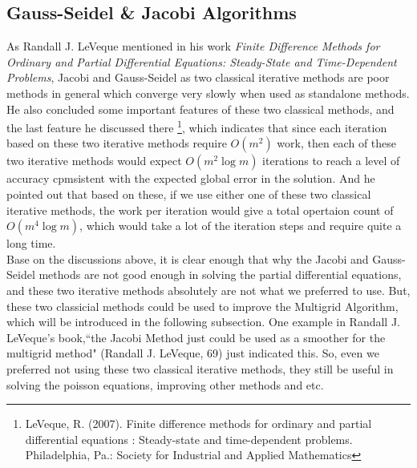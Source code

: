 \documentclass [a4paper, 12pt]{article}
\begin{document}
\subsection {Gauss-Seidel \& Jacobi Algorithms}
As Randall J. LeVeque mentioned in his work \emph {Finite Difference Methods for Ordinary and Partial Differential Equations: Steady-State and Time-Dependent Problems}, Jacobi and Gauss-Seidel as two classical iterative methods are poor methods in general which converge very slowly when used as standalone methods. He also concluded some important features of these two classical methods, and the last feature he discussed there \footnote {LeVeque, R. (2007). Finite difference methods for ordinary and partial differential equations : Steady-state and time-dependent problems. Philadelphia, Pa.: Society for Industrial and Applied Mathematics}, which indicates that since each iteration based on these two iterative methods require $O(m^2)$ work, then each of these two iterative methods would expect $O(m^2\log m)$ iterations to reach a level of accuracy cpmsistent with the expected global error in the solution. And he pointed out that based on these, if we use either one of these two classical iterative methods, the work per iteration would give a total opertaion count of $O(m^4\log m)$, which would take a lot of the iteration steps and require quite a long time. \\
Base on the discussions above, it is clear enough that why the Jacobi and Gauss-Seidel methods are not good enough in solving the partial differential equations, and these two iterative methods absolutely are not what we preferred to use. But, these two classicial methods could be used to improve the Multigrid Algorithm, which will be introduced in the following subsection. One example in Randall J. LeVeque's book,``the Jacobi Method just could be used as a smoother for the multigrid method" (Randall J. LeVeque, 69) just indicated this. So, even we preferred not using these two classical iterative methods, they still be useful in solving the poisson equations, improving other methods and etc.
\end{document}
